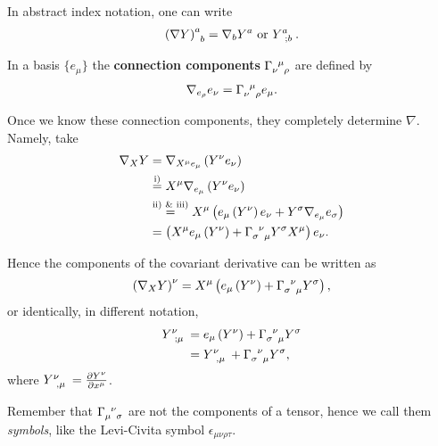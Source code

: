 In abstract index notation, one can write
\begin{align}
    \tensor{\left( \nabla Y \right)}{^{a}_b} = \nabla_b Y^{a}  \text{~or~} \tensor{Y}{^{a}_{;b}}
.\end{align}

\begin{definition}
    In a basis $\{e_{\mu}\} $ the \textbf{connection components} $\tensor{\Gamma}{_{\nu}^{\mu}_{\rho}}$ are defined by
    \begin{align}
        \nabla_{e_{\rho}} e_{\nu} = \tensor{\Gamma}{_{\nu}^{\mu}_\rho} e_{\mu}
    .\end{align}
\end{definition}

Once we know these connection components, they completely determine $\nabla$. Namely, take
\begin{align}
    \nabla_{X} Y  &= \nabla_{X^{\mu}e_{\mu}} \left( Y^{\nu} e_{\nu} \right)  \\
                  &\overset{\text{i)}}{=} X^{\mu} \nabla_{e_{\mu}} \left( Y^{\nu} e_{\nu} \right)  \\
                  &\overset{\text{ii) \& iii)}}{=} X^{\mu}  \left( e_{\mu} \left( Y^{\nu} \right) e_{\nu} + Y^{\sigma} \nabla_{e_\mu} e_\sigma \right)  \\
                  &= \left( X^{\mu} e_\mu \left( Y^{\nu} \right) + \tensor{\Gamma}{_{\sigma}^{\nu}_{\mu}} Y^{\sigma} X^{\mu}  \right) e_{\nu}
.\end{align}

Hence the components of the covariant derivative can be written as
\begin{align}
    \left( \nabla_X Y \right)^{\nu} = X^{\mu} \left( e_\mu \left( Y^{\nu} \right) + \tensor{\Gamma}{_{\sigma}^{\nu}_\mu} Y^{\sigma} \right) 
,\end{align}
or identically, in different notation,
\begin{align}
    \tensor{Y}{^{\nu}_{; \mu}} &= e_{\mu} \left( Y^{\nu} \right)  + \tensor{\Gamma}{_{\sigma}^{\nu}_{\mu}} Y^{\sigma} \\
    &= \tensor{Y}{^{\nu}_{,\mu}} + \tensor{\Gamma}{_{\sigma}^{\nu}_{\mu}} Y^{\sigma}
,\end{align}
where $\tensor{Y}{^{\nu}_{,\mu}} = \pdv{Y^{\nu}}{x^{\mu}}$.

\begin{note}
    Remember that $\tensor{\Gamma}{_{\mu}^{\nu}_\sigma}$ are not the components of a tensor, hence we call them \textit{symbols}, like the Levi-Civita symbol $\epsilon_{\mu \nu \rho \tau}$.
\end{note}

